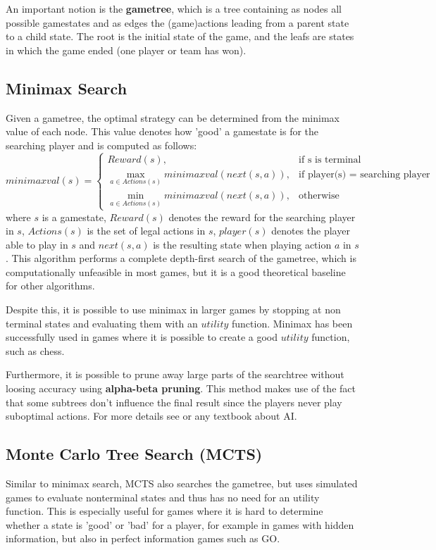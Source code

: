 An important notion is the \textbf{gametree}, which is a tree containing as nodes all possible gamestates and as edges the (game)actions leading from a parent state to a child state. The root is the initial state of the game, and the leafs are states in which the game ended (one player or team has won).

\subsection{Minimax Search}
Given a gametree, the optimal strategy can be determined from the minimax value of each node. This value denotes how 'good' a gamestate is for the searching player and is computed as follows:
$$
    minimaxval(s)=
\begin{cases}
    Reward(s), & \text{if s is terminal} \\
    \max_{a\in Actions(s)} minimaxval(next(s, a)), & \text{if player(s) = searching player} \\
    \min_{a\in Actions(s)} minimaxval(next(s, a)), & \text{otherwise}
\end{cases}
$$
where $s$ is a gamestate, $Reward(s)$ denotes the reward for the searching player in $s$, $Actions(s)$ is the set of legal actions in $s$, $player(s)$ denotes the player able to play in $s$ and $next(s, a)$ is the resulting state when playing action $a$ in $s$. \newline
This algorithm performs a complete depth-first search of the gametree, which is computationally unfeasible in most games, but it is a good theoretical baseline for other algorithms.

Despite this, it is possible to use minimax in larger games by stopping at non terminal states and evaluating them with an $utility$ function.
Minimax has been successfully used in games where it is possible to create a good $utility$ function, such as chess.

Furthermore, it is possible to prune away large parts of the searchtree without loosing accuracy using \textbf{alpha-beta pruning}. This method makes use of the fact that some subtrees don't influence the final result since the players never play suboptimal actions. For more details see \cite[chapter 5, p.~170+]{russel14} or any textbook about AI.

\subsection{Monte Carlo Tree Search (MCTS)}
Similar to minimax search, MCTS also searches the gametree, but uses simulated games to evaluate nonterminal states and thus has no need for an utility function. This is especially useful for games where it is hard to determine whether a state is 'good' or 'bad' for a player, for example in games with hidden information, but also in perfect information games such as GO.


